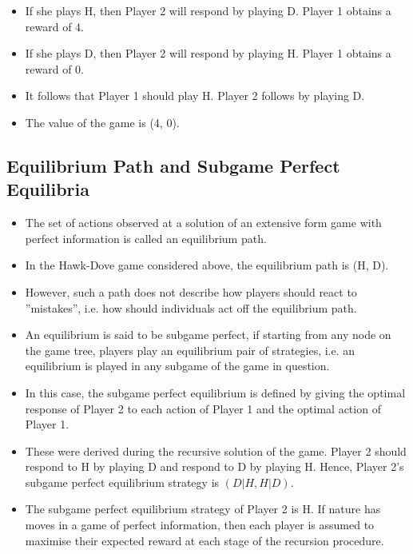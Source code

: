 \documentclass[]{report}
\begin{document}
\begin{itemize}
	\item If she plays H, then Player 2 will respond by playing D. Player 1
	obtains a reward of 4.
	\item 	If she plays D, then Player 2 will respond by playing H. Player 1
	obtains a reward of 0.
	\item 	It follows that Player 1 should play H. Player 2 follows by playing
	D.
	\item 	The value of the game is (4, 0).
	
\end{itemize}

\subsection{Equilibrium Path and Subgame Perfect Equilibria}
\begin{itemize}
\item The set of actions observed at a solution of an extensive form
	game with perfect information is called an equilibrium path.
\item In the Hawk-Dove game considered above, the equilibrium path is
	(H, D).
\item However, such a path does not describe how players should react to
	”mistakes”, i.e. how should individuals act off the equilibrium path.
\item An equilibrium is said to be subgame perfect, if starting from any
	node on the game tree, players play an equilibrium pair of
	strategies, i.e. an equilibrium is played in any subgame of the game
	in question.
\end{itemize}


\begin{itemize}
\item In this case, the subgame perfect equilibrium is defined by giving
the optimal response of Player 2 to each action of Player 1 and the
optimal action of Player 1.
\item These were derived during the recursive solution of the game.
Player 2 should respond to H by playing D and respond to D by
playing H. Hence, Player 2’s subgame perfect equilibrium strategy
is $(D|H, H|D)$.
\item The subgame perfect equilibrium strategy of Player 2 is H.
If nature has moves in a game of perfect information, then each
player is assumed to maximise their expected reward at each
stage of the recursion procedure.

\end{itemize}
\end{document}
